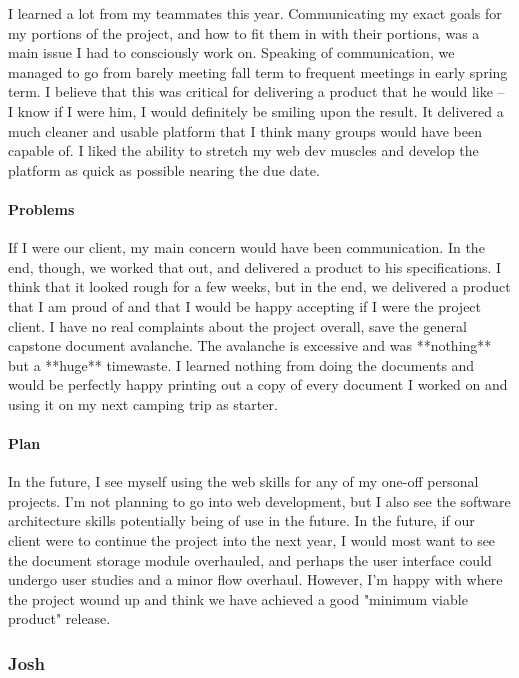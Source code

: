 \documentclass[onecolumn, draftclsnofoot,10pt, compsoc]{IEEEtran}
\begin{document}
	I learned a lot from my teammates this year. Communicating my exact goals for my portions of the project, and how to fit them in with their portions, was a main issue I had to consciously work on. Speaking of communication, we managed to go from barely meeting fall term to frequent meetings in early spring term. I believe that this was critical for delivering a product that he would like -- I know if I were him, I would definitely be smiling upon the result. It delivered a much cleaner and usable platform that I think many groups would have been capable of. I liked the ability to stretch my web dev muscles and develop the platform as quick as possible nearing the due date.
	
	\paragraph{Problems}
	
	If I were our client, my main concern would have been communication. In the end, though, we worked that out, and delivered a product to his specifications. I think that it looked rough for a few weeks, but in the end, we delivered a product that I am proud of and that I would be happy accepting if I were the project client. I have no real complaints about the project overall, save the general capstone document avalanche. The avalanche is excessive and was **nothing** but a **huge** timewaste. I learned nothing from doing the documents and would be perfectly happy printing out a copy of every document I worked on and using it on my next camping trip as starter.
	
	\paragraph{Plan}
	
	In the future, I see myself using the web skills for any of my one-off personal projects. I'm not planning to go into web development, but I also see the software architecture skills potentially being of use in the future. In the future, if our client were to continue the project into the next year, I would most want to see the document storage module overhauled, and perhaps the user interface could undergo user studies and a minor flow overhaul. However, I'm happy with where the project wound up and think we have achieved a good "minimum viable product" release. 
	
	\subsubsection{Josh}
	
\end{document}
